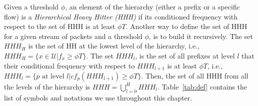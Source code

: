 Given a threshold $\phi$, an element of the hierarchy (either a prefix or a specific flow) is a \textit{Hierarchical Heavy Hitter (HHH)} if its conditioned frequency with respect to the set of HHH is at least $\phi T$. Another way to define the set of HHH for a given stream of packets and a threshold $\phi$, is to build it recursively. The set $HHH_H$ is the set of HH at the lowest level of the hierarchy, i.e., $HHH_H=\{x\in \mathcal U| f_x \geq \phi T\}$. The set $HHH_l$, is the set of all prefixes at level $l$ that their conditional frequency with respect to $HHH_{l+1}$ is at least $\phi T$, i.e., $HHH_l=\{p \text{ at level } l | cf_p(HHH_{l+1}) \geq \phi T\}$. Then, the set of all HHH from all the levels of the hierarchy is $HHH=\bigcup_{l=0}^{H}HHH_l$.
 Table~\ref{tab:def} contains the list of symbols and notations we use throughout this chapter.
\begin{table}[ht]
	\caption{A list of symbols and notations}
	\label{tab:def}
\end{table}
